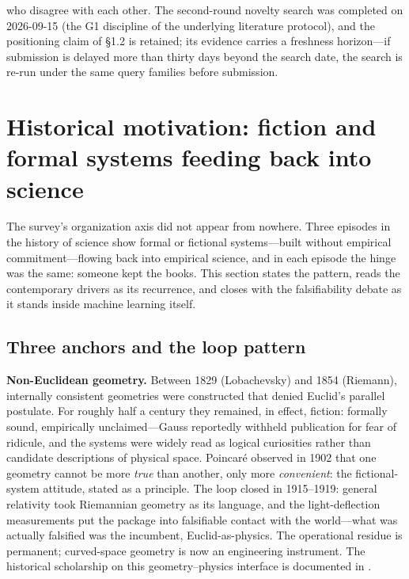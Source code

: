 \documentclass[11pt,a4paper]{article}
\begin{document}
who disagree with each other. The second-round novelty search was completed on 2026-09-15 (the G1 discipline of the underlying literature protocol), and the positioning claim of §1.2 is retained; its evidence carries a freshness horizon—if submission is delayed more than thirty days beyond the search date, the search is re-run under the same query families before submission.

\section{Historical motivation: fiction and formal systems feeding back into science}

The survey's organization axis did not appear from nowhere. Three episodes in the history of science show formal or fictional systems—built without empirical commitment—flowing back into empirical science, and in each episode the hinge was the same: someone kept the books. This section states the pattern, reads the contemporary drivers as its recurrence, and closes with the falsifiability debate as it stands inside machine learning itself.

\subsection{Three anchors and the loop pattern}

\textbf{Non-Euclidean geometry.} Between 1829 (Lobachevsky) and 1854 (Riemann), internally consistent geometries were constructed that denied Euclid's parallel postulate. For roughly half a century they remained, in effect, fiction: formally sound, empirically unclaimed—Gauss reportedly withheld publication for fear of ridicule, and the systems were widely read as logical curiosities rather than candidate descriptions of physical space. Poincaré observed in 1902 that one geometry cannot be more \textit{true} than another, only more \textit{convenient}: the fictional-system attitude, stated as a principle. The loop closed in 1915–1919: general relativity took Riemannian geometry as its language, and the light-deflection measurements put the package into falsifiable contact with the world—what was actually falsified was the incumbent, Euclid-as-physics. The operational residue is permanent; curved-space geometry is now an engineering instrument. The historical scholarship on this geometry–physics interface is documented in \cite{key18}.
\end{document}
